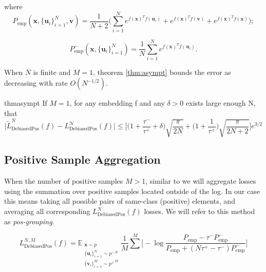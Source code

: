 \documentclass{article}
\begin{document}
where
\begin{equation} \label{eq:13}
P_{\text{emp}} (\textbf{x}, \{\textbf{u}_i\}_{i=1}^N, \textbf{v}) = \frac{1}{N+2} \bigg(\sum \limits_{i=1}^N e^{f(\textbf{x})^T f(\textbf{u}_i)} + e^{f(\textbf{x})^T f(\textbf{v})} + e^{f(\textbf{x})^T f(\textbf{x})}\bigg);
\end{equation}

\begin{equation} \label{eq:14}
P_{\text{emp}}^- (\textbf{x}, \{\textbf{u}_i\}_{i=1}^N) = \frac{1}{N} \sum \limits_{i=1}^N e^{f(\textbf{x})^T f(\textbf{u}_i)}.
\end{equation}

When $N$ is finite and $M=1$, theorem \ref{thm:asympt} bounds the error as decreasing with rate $O(N^{-1/2})$.

\begin{restatable}[]{thm}{asympt}
\label{thm:asympt}
If $M = 1$, for any embedding f and any $\delta > 0$ exists large enough N, that
\begin{equation} \label{eq:15}
\big|\tilde{L}_{\text{DebiasedPos}}^N (f) - L_{\text{DebiasedPos}}^N (f)\big| \leq \bigg[\bigg(1 + \frac{\tau^-}{\tau^+} + \delta\bigg) \sqrt{\frac{\pi}{2N}} + \bigg(1 + \frac{1}{\tau^+}\bigg) \sqrt{\frac{\pi}{2N + 2}}\bigg] e^{3/2}
\end{equation}
\end{restatable}

\subsection{Positive Sample Aggregation} \label{pos_aggr_theory}

When the number of positive samples $M > 1$, similar to \citep{khosla2021supervised} we will aggregate losses using the summation over positive samples located outside of the log. In our case this means taking all possible pairs of same-class (positive) elements, and averaging all corresponding $L_{\text{DebiasedPos}}^N (f)$ losses. We will refer to this method as \textit{pos-grouping}.


\begin{equation} \label{eq:16}
L_{\text{DebiasedPos}}^{N, M} (f) = \mathbb{E}_{\substack{\textbf{x} \sim p \\ \{\textbf{u}_i\}_{i=1}^N \sim {p^-}^N \\ \{\textbf{v}_i\}_{i=1}^M\sim {p^+}^M}} \frac{1}{M} \sum\limits^M \bigg[-\log \frac{P_{\text{emp}} - \tau^- P_{\text{emp}}^-}{P_{\text{emp}} + (N \tau^+ - \tau^-) P_{\text{emp}}^-}\bigg]
\end{equation}
\end{document}
